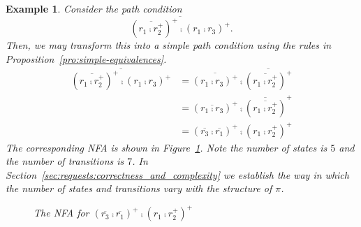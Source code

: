 \documentclass{article}
\newtheorem{example}{Example}
\begin{document}
\begin{example}
Consider the path condition
\[
 \overline{\left(\overline{r_1 \comp r_2^+}\right)^+ \comp (r_1 \comp r_3)^+}.
\]
Then, we may transform this into a simple path condition using the rules in Proposition~\ref{pro:simple-equivalences}.
\begin{align*}
 \overline{(\overline{r_1 \comp r_2^+})^+ \comp (r_1 \comp r_3)^+} &= \overline{\left(r_1 \comp r_3\right)^+} \comp \overline{\left(\overline{r_1 \comp r_2^+}\right)^+} \\
   &= (\overline{r_1 \comp r_3})^+ \comp \overline{\left(\overline{r_1 \comp r_2^+}\right)}^+ \\
   &= (\overline{r_3} \comp \overline{r_1})^+ \comp (r_1 \comp r_2^+)^+
\end{align*}
The corresponding NFA is shown in Figure~\ref{fig:example-nfa-for-complexity}.
Note the number of states is $5$ and the number of transitions is $7$.
In Section~\ref{sec:requests:correctness_and_complexity} we establish the way in which the number of states and transitions vary with the structure of $\pi$.

\begin{figure}[!ht]\centering
    \caption{The NFA for $(\overline{r_3} \comp \overline{r_1})^+ \comp (r_1 \comp r_2^+)^+$} \label{fig:example-nfa-for-complexity}
\end{figure}
\end{example}
\end{document}
